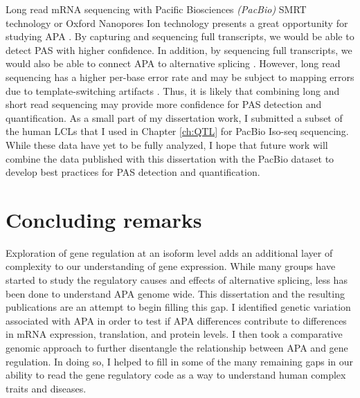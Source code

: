 Long read mRNA sequencing with Pacific Biosciences \emph{(PacBio)} SMRT technology or Oxford Nanopores Ion technology presents a great opportunity for studying APA \citep{amarasinghe_opportunities_2020}. By capturing and sequencing full transcripts, we would be able to detect PAS with higher confidence. In addition, by sequencing full transcripts, we would also be able to connect APA to alternative splicing \citep{amarasinghe_opportunities_2020, reimer_rapid_2020}. However, long read sequencing has a higher per-base error rate and may be subject to mapping errors due to template-switching artifacts \citep{balazs_template-switching_2019}. Thus, it is likely that combining long and short read sequencing may provide more confidence for PAS detection and quantification. As a small part of my dissertation work, I submitted a subset of the human LCLs that I used in Chapter \ref{ch:QTL} for PacBio Iso-seq sequencing. While these data have yet to be fully analyzed, I hope that future work will combine the data published with this dissertation with the PacBio dataset to develop best practices for PAS detection and quantification.


\section{Concluding remarks}

Exploration of gene regulation at an isoform level adds an additional layer of complexity to our understanding of gene expression. While many groups have started to study the regulatory causes and effects of alternative splicing, less has been done to understand APA genome wide. This dissertation and the resulting publications are an attempt to begin filling this gap. I identified genetic variation associated with APA in order to test if APA differences contribute to differences in mRNA expression, translation, and protein levels. I then took a comparative genomic approach to further disentangle the relationship between APA and gene regulation. In doing so, I helped to fill in some of the many remaining gaps in our ability to read the gene regulatory code as a way to understand human complex traits and diseases. 


